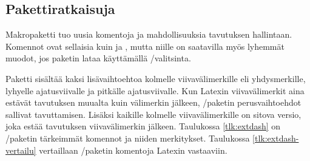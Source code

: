 \subsection{Pakettiratkaisuja}

Makropaketti  tuo uusia komentoja ja mahdollisuuksia
tavutuksen hallintaan. Komennot ovat sellaisia kuin  ja , mutta niille on saatavilla myös
lyhemmät muodot, jos paketin lataa käyttämällä
\-/valitsinta.

\begin{koodilohkosis}
  \usepackage[shortcuts]{extdash}
\end{koodilohkosis}

Paketti sisältää kaksi lisä\-vaihto\-ehtoa kolmelle viivavälimerkille
eli yhdysmerkille, lyhyelle ajatusviivalle ja pitkälle ajatusviivalle.
Kun Latexin viivavälimerkit aina estävät tavutuksen muualta kuin
välimerkin jälkeen, \-/paketin perus\-vaihto\-ehdot
sallivat tavuttamisen. Lisäksi kaikille kolmelle viivavälimerkille on
sitova versio, joka estää tavutuksen viivavälimerkin jälkeen. Taulukossa
\ref{tlk:extdash} on \-/paketin tärkeimmät komennot ja
niiden merkitykset. Taulukossa \ref{tlk:extdash-vertailu} vertaillaan
\-/paketin komentoja Latexin vastaaviin.


